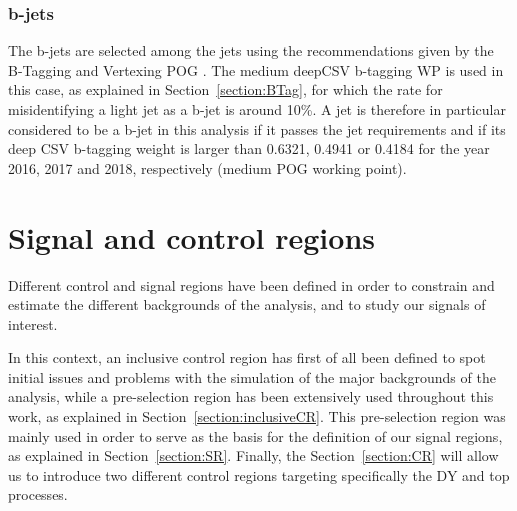 \documentclass[a4paper, 10pt, openright]{report}
\begin{document}
\subsubsection{b-jets}

The b-jets are selected among the jets using the recommendations given by the B-Tagging and Vertexing \ac{POG} \cite{BTagPOG}. The medium deepCSV b-tagging \ac{WP} is used in this case, as explained in Section~\ref{section:BTag}, for which the rate for misidentifying a light jet as a b-jet is around 10\%. A jet is therefore in particular considered to be a b-jet in this analysis if it passes the jet requirements and if its deep CSV b-tagging weight is larger than 0.6321, 0.4941 or 0.4184 for the year 2016, 2017 and 2018, respectively (medium \ac{POG} working point).


\section{Signal and control regions}

Different control and signal regions have been defined in order to constrain and estimate the different backgrounds of the analysis, and to study our signals of interest. 

In this context, an inclusive control region has first of all been defined to spot initial issues and problems with the simulation of the major backgrounds of the analysis, while a pre-selection region has been extensively used throughout this work, as explained in Section~\ref{section:inclusiveCR}. This pre-selection region was mainly used in order to serve as the basis for the definition of our signal regions, as explained in Section~\ref{section:SR}. Finally, the Section~\ref{section:CR} will allow us to introduce two different control regions targeting specifically the \ac{DY} and top processes.
\end{document}
